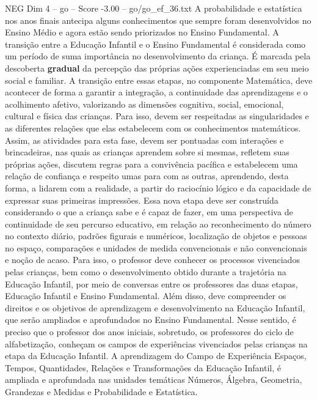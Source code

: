 \begin{textsample}{NEG Dim 4 – go – Score -3.00 – go/go\_ef\_36.txt}
A probabilidade e estatística nos anos finais antecipa alguns conhecimentos que sempre foram desenvolvidos no Ensino Médio e agora estão sendo priorizados no Ensino Fundamental.
A transição entre a Educação Infantil e o Ensino Fundamental é considerada como um período de suma importância no desenvolvimento da criança.
É marcada pela descoberta \textbf{gradual} da percepção das próprias ações experienciadas em seu meio social e familiar.
A transição entre essas etapas, no componente Matemática, deve acontecer de forma a garantir a integração, a continuidade das aprendizagens e o acolhimento afetivo, valorizando as dimensões cognitiva, social, emocional, cultural e física das crianças.
Para isso, devem ser respeitadas as singularidades e as diferentes relações que elas estabelecem com os conhecimentos matemáticos.
Assim, as atividades para esta fase, devem ser pontuadas com interações e brincadeiras, nas quais as crianças aprendem sobre si mesmas, refletem suas próprias ações, discutem regras para a convivência pacífica e estabelecem uma relação de confiança e respeito umas para com as outras, aprendendo, desta forma, a lidarem com a realidade, a partir do raciocínio lógico e da capacidade de expressar suas primeiras impressões.
Essa nova etapa deve ser construída considerando o que a criança sabe e é capaz de fazer, em uma perspectiva de continuidade de seu percurso educativo, em relação ao reconhecimento do número no contexto diário, padrões figurais e numéricos, localização de objetos e pessoas no espaço, comparações e unidades de medida convencionais e não convencionais e noção de acaso.
Para isso, o professor deve conhecer os processos vivenciados pelas crianças, bem como o desenvolvimento obtido durante a trajetória na Educação Infantil, por meio de conversas entre os professores das duas etapas, Educação Infantil e Ensino Fundamental.
Além disso, deve compreender os direitos e os objetivos de aprendizagem e desenvolvimento na Educação Infantil, que serão ampliados e aprofundados no Ensino Fundamental.
Nesse sentido, é preciso que o professor dos anos iniciais, sobretudo, os professores do ciclo de alfabetização, conheçam os campos de experiências vivenciados pelas crianças na etapa da Educação Infantil.
A aprendizagem do Campo de Experiência Espaços, Tempos, Quantidades, Relações e Transformações da Educação Infantil, é ampliada e aprofundada nas unidades temáticas Números, Álgebra, Geometria, Grandezas e Medidas e Probabilidade e Estatística.

\end{textsample}
